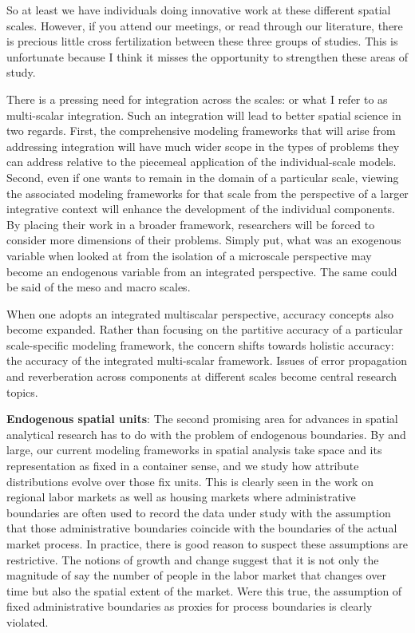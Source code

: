 \documentclass[11pt]{article}
\begin{document}
So at least we have individuals doing innovative work at these
different spatial scales. However, if you attend our meetings, or read through
our literature, there is precious little cross fertilization between these
three groups of studies. This is unfortunate because I think it misses the
opportunity to strengthen these areas of study.

There is a pressing need for integration across the scales: or what I refer to
as multi-scalar integration. Such an integration will lead to better spatial
science in two regards. First, the comprehensive modeling frameworks that will
arise from addressing integration will have much wider scope in the types of
problems they can address relative to the piecemeal application of the
individual-scale models. Second, even if one wants to remain in the domain of a
particular scale, viewing the associated modeling frameworks for that scale
from the perspective of a larger integrative context will enhance the development
of the individual components. By placing their work in a broader framework,
researchers will be forced to consider more dimensions of their problems.
Simply put, what was an exogenous variable when looked at from the isolation of
a microscale perspective may become an endogenous variable from an integrated
perspective. The same could be said of the meso and macro scales.

When one adopts an integrated multiscalar perspective, accuracy concepts also
become expanded. Rather than focusing on the partitive accuracy of a particular
scale-specific modeling framework, the concern shifts towards holistic accuracy:
the accuracy of the integrated multi-scalar framework. Issues of error
propagation and reverberation across components at different scales become
central research topics.


\textbf{Endogenous spatial units}: The second promising area for advances in spatial
analytical research has to do with the problem of endogenous boundaries. By and
large, our current modeling frameworks in spatial analysis take space and its
representation as fixed in a container sense, and we study how attribute
distributions evolve over those fix units. This is clearly seen in the work on
regional labor markets as well as housing markets where administrative
boundaries are often used to record the data under study with the assumption
that those administrative boundaries coincide with the boundaries of the actual
market process. In practice, there is good reason to suspect these assumptions
are restrictive. The  notions of growth and change suggest that it is not
only the magnitude of say the number of people in the labor market that changes
over time but also the spatial extent of the market. Were this true, the
assumption of fixed administrative boundaries as proxies for process boundaries
is clearly violated.
\end{document}
